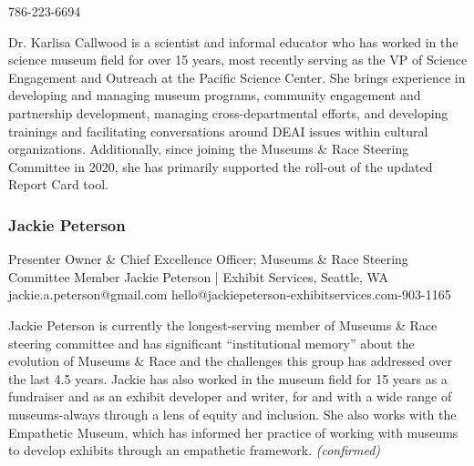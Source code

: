 \documentclass{report}
\begin{document}
              786-223-6694\newline

              Dr. Karlisa Callwood is a scientist and informal educator who has worked in the science museum field for over 15 years, most recently serving as the VP of Science Engagement and Outreach at the Pacific Science Center. She brings experience in developing and managing museum programs, community engagement and partnership development, managing cross-departmental efforts, and developing trainings and facilitating conversations around DEAI issues within cultural organizations. Additionally, since joining the Museums \& Race Steering Committee in 2020, she has primarily supported the roll-out of the updated Report Card tool.\newline


              

              
                \subsubsection*{ Jackie Peterson }
                Presenter\newline
                Owner \& Chief Excellence Officer; Museums \& Race Steering Committee Member\newline
                Jackie Peterson | Exhibit Services, Seattle, WA
                \newline
                jackie.a.peterson@gmail.com\newline
                hello@jackiepeterson-exhibitservices.com-903-1165\newline

                Jackie Peterson is currently the longest-serving member of Museums \& Race steering committee and has significant “institutional memory” about the evolution of Museums \& Race and the challenges this group has addressed over the last 4.5 years. Jackie has also worked in the museum field for 15 years as a fundraiser and as an exhibit developer and writer, for and with a wide range of museums-always through a lens of equity and inclusion. She also works with the Empathetic Museum, which has informed her practice of working with museums to develop exhibits through an empathetic framework.
                \emph{ (confirmed) }
              

              
\end{document}
